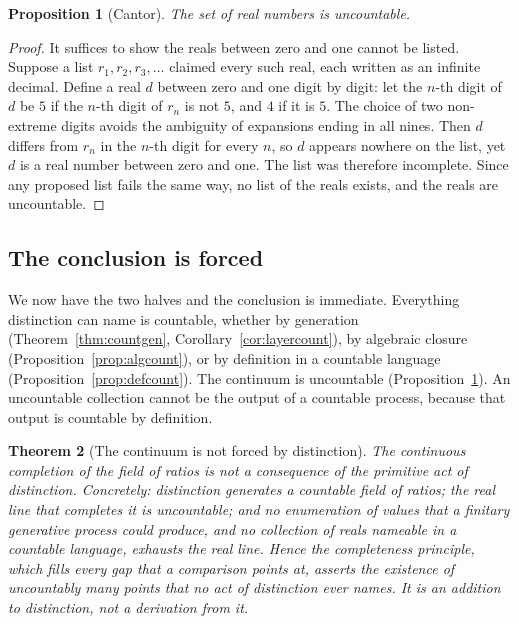 \documentclass[11pt,a4paper]{article}
\newtheorem{theorem}{Theorem}[section]
\newtheorem{proposition}[theorem]{Proposition}
\theoremstyle{definition}
\theoremstyle{remark}
\begin{document}
\begin{proposition}[Cantor]\label{prop:cantor}
The set of real numbers is uncountable.
\end{proposition}

\begin{proof}
It suffices to show the reals between zero and one cannot be listed. Suppose a
list $r_1, r_2, r_3, \dots$ claimed every such real, each written as an infinite
decimal. Define a real $d$ between zero and one digit by digit: let the $n$-th
digit of $d$ be $5$ if the $n$-th digit of $r_n$ is not $5$, and $4$ if it is
$5$. The choice of two non-extreme digits avoids the ambiguity of expansions
ending in all nines. Then $d$ differs from $r_n$ in the $n$-th digit for every
$n$, so $d$ appears nowhere on the list, yet $d$ is a real number between zero and
one. The list was therefore incomplete. Since any proposed list fails the same
way, no list of the reals exists, and the reals are uncountable.
\end{proof}

\subsection{The conclusion is forced}

We now have the two halves and the conclusion is immediate. Everything
distinction can name is countable, whether by generation
(Theorem~\ref{thm:countgen}, Corollary~\ref{cor:layercount}), by algebraic
closure (Proposition~\ref{prop:algcount}), or by definition in a countable
language (Proposition~\ref{prop:defcount}). The continuum is uncountable
(Proposition~\ref{prop:cantor}). An uncountable collection cannot be the output
of a countable process, because that output is countable by definition.

\begin{theorem}[The continuum is not forced by distinction]
\label{thm:main}
The continuous completion of the field of ratios is not a consequence of the
primitive act of distinction. Concretely: distinction generates a countable
field of ratios; the real line that completes it is uncountable; and no
enumeration of values that a finitary generative process could produce, and no
collection of reals nameable in a countable language, exhausts the real line.
Hence the completeness principle, which fills every gap that a comparison points
at, asserts the existence of uncountably many points that no act of distinction
ever names. It is an addition to distinction, not a derivation from it.
\end{theorem}
\end{document}
